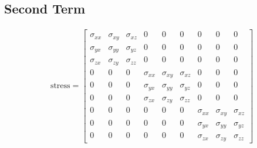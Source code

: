 \subsection{Second Term}

\begin{eqnarray}
\text{stress} =
\begin{bmatrix}
\sigma_{xx} & \sigma_{xy} & \sigma_{xz} & 0 & 0 & 0 & 0 & 0 & 0 \\
\sigma_{yx} & \sigma_{yy} & \sigma_{yz} & 0 & 0 & 0 & 0 & 0 & 0 \\
\sigma_{zx} & \sigma_{zy} & \sigma_{zz} & 0 & 0 & 0 & 0 & 0 & 0 \\
0 & 0 & 0 & \sigma_{xx} & \sigma_{xy} & \sigma_{xz} & 0 & 0 & 0 \\
0 & 0 & 0 & \sigma_{yx} & \sigma_{yy} & \sigma_{yz} & 0 & 0 & 0 \\
0 & 0 & 0 & \sigma_{zx} & \sigma_{zy} & \sigma_{zz} & 0 & 0 & 0 \\
0 & 0 & 0 & 0 & 0 & 0 & \sigma_{xx} & \sigma_{xy} & \sigma_{xz} \\
0 & 0 & 0 & 0 & 0 & 0 & \sigma_{yx} & \sigma_{yy} & \sigma_{yz} \\
0 & 0 & 0 & 0 & 0 & 0 & \sigma_{zx} & \sigma_{zy} & \sigma_{zz} 
\end{bmatrix}
\end{eqnarray}
%
